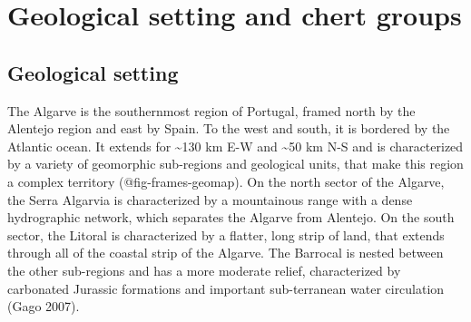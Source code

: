 \documentclass[
  a4paper,
  DIV=11,
  numbers=noendperiod]{scrreprt}
\begin{document}
\section*{Geological setting and chert
groups}\label{geological-setting-and-chert-groups}


\subsection*{Geological setting}\label{geological-setting}

The Algarve is the southernmost region of Portugal, framed north by the
Alentejo region and east by Spain. To the west and south, it is bordered
by the Atlantic ocean. It extends for \textasciitilde130 km E-W and
\textasciitilde50 km N-S and is characterized by a variety of geomorphic
sub-regions and geological units, that make this region a complex
territory (@fig-frames-geomap). On the north sector of the Algarve, the
Serra Algarvia is characterized by a mountainous range with a dense
hydrographic network, which separates the Algarve from Alentejo. On the
south sector, the Litoral is characterized by a flatter, long strip of
land, that extends through all of the coastal strip of the Algarve. The
Barrocal is nested between the other sub-regions and has a more moderate
relief, characterized by carbonated Jurassic formations and important
sub-terranean water circulation (Gago 2007).
\end{document}
